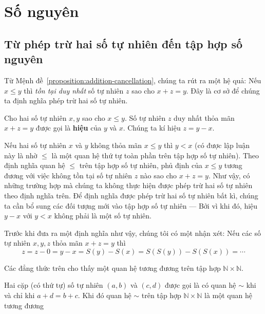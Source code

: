 \section{Số nguyên}\label{section:integers}

\subsection{Từ phép trừ hai số tự nhiên đến tập hợp số nguyên}

Từ Mệnh đề~\ref{proposition:addition-cancellation}, chúng ta rút ra một hệ quả: Nếu $x\leq y$ thì \textit{tồn tại duy nhất} số tự nhiên $z$ sao cho $x + z = y$. Đây là cơ sở để chúng ta định nghĩa phép trừ hai số tự nhiên.

\begin{definition}
    Cho hai số tự nhiên $x, y$ sao cho $x\leq y$. Số tự nhiên $z$ duy nhất thỏa mãn $x + z = y$ được gọi là \textbf{hiệu} của $y$ và $x$. Chúng ta kí hiệu $z = y - x$.
\end{definition}

Nếu hai số tự nhiên $x$ và $y$ không thỏa mãn $x\leq y$ thì $y < x$ (có được lập luận này là nhờ $\leq$ là một quan hệ thứ tự toàn phần trên tập hợp số tự nhiên). Theo định nghĩa quan hệ $\leq$ trên tập hợp số tự nhiên, phủ định của $x\leq y$ tương đương với việc không tồn tại số tự nhiên $z$ nào sao cho $x + z = y$. Như vậy, có những trường hợp mà chúng ta không thực hiện được phép trừ hai số tự nhiên theo định nghĩa trên. Để định nghĩa được phép trừ hai số tự nhiên bất kì, chúng ta cần bổ sung các đối tượng mới vào tập hợp số tự nhiên --- Bởi vì khi đó, hiệu $y - x$ với $y < x$ không phải là một số tự nhiên.

Trước khi đưa ra một định nghĩa như vậy, chúng tôi có một nhận xét: Nếu các số tự nhiên $x, y, z$ thỏa mãn $x + z = y$ thì
\[
    z = z - 0 = y - x = S(y) - S(x) = S(S(y)) - S(S(x)) = \cdots
\]

Các đẳng thức trên cho thấy một quan hệ tương đương trên tập hợp $\mathbb{N}\times\mathbb{N}$.
\begin{theorem}
    Hai cặp (có thứ tự) số tự nhiên $(a, b)$ và $(c, d)$ được gọi là có quan hệ $\sim$ khi và chỉ khi $a + d = b + c$. Khi đó quan hệ $\sim$ trên tập hợp $\mathbb{N}\times\mathbb{N}$ là một quan hệ tương đương
\end{theorem}

